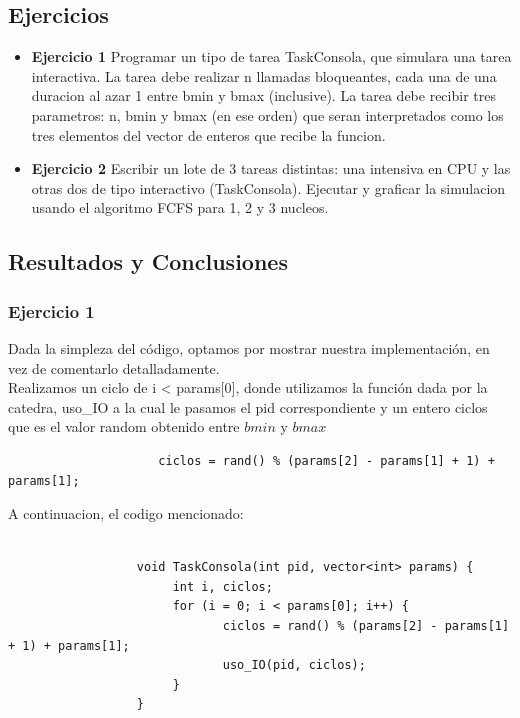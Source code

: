 
\subsection{Ejercicios}
\begin{itemize}
 \item \textbf{Ejercicio 1 } Programar un tipo de tarea TaskConsola, que simulara una tarea interactiva.
La tarea debe realizar n llamadas bloqueantes, cada una de una duracion al azar 1 entre bmin
y bmax (inclusive). La tarea debe recibir tres parametros: n, bmin y bmax (en ese orden) que
seran interpretados como los tres elementos del vector de enteros que recibe la funcion.
\item \textbf{Ejercicio 2} Escribir un lote de 3 tareas distintas: una intensiva en CPU y las otras dos de
tipo interactivo (TaskConsola). Ejecutar y graficar la simulacion usando el algoritmo FCFS
para 1, 2 y 3 nucleos.
\end{itemize}

\subsection{Resultados y Conclusiones}

\subsubsection[Resolución Ejercicio 1]{Ejercicio 1}

\indent Dada la simpleza del código, optamos por mostrar nuestra implementación, en vez de comentarlo detalladamente.\\
\indent Realizamos un ciclo de i < params[0], donde utilizamos la función dada por la catedra, uso\_IO a la cual le pasamos
el pid correspondiente y un entero ciclos que es el valor random obtenido entre $bmin$ y $bmax$ 
\begin{center}
 \begin{verbatim}
                     ciclos = rand() % (params[2] - params[1] + 1) + params[1];
 \end{verbatim}

\end{center}

\indent A continuacion, el codigo mencionado:

\begin{verbatim}

                  void TaskConsola(int pid, vector<int> params) {
                       int i, ciclos;              
                       for (i = 0; i < params[0]; i++) {
                              ciclos = rand() % (params[2] - params[1] + 1) + params[1];  
                              uso_IO(pid, ciclos);
                       }
                  } 

\end{verbatim}

